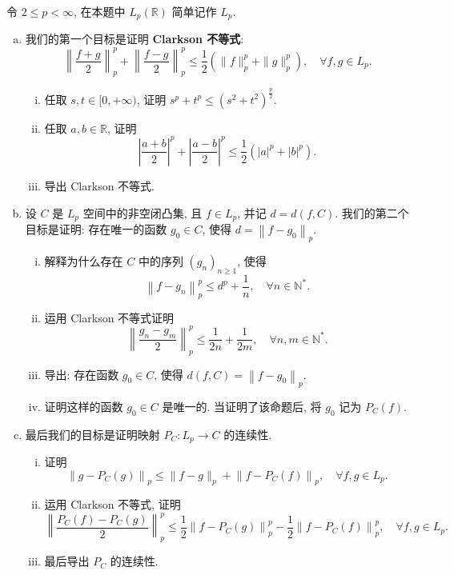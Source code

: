 \begin{exercise}
  令 $2 \leq p<\infty$, 在本题中 $L_{p}(\mathbb{R})$ 简单记作 $L_{p}$.
  \begin{enumerate}[(a)]
    \item 我们的第一个目标是证明 \textbf{Clarkson 不等式}:
      \[ \left\|\frac{f+g}{2}\right\|_{p}^{p}+\left\|\frac{f-g}{2}\right\|_{p}^{p} \leq \frac{1}{2}\left(\|f\|_{p}^{p}+\|g\|_{p}^{p}\right), \quad \forall f, g \in L_{p}. \]
      \begin{enumerate}[(i)]
        \item 任取 $s, t \in[0,+\infty)$, 证明 $s^{p}+t^{p} \leq\left(s^{2}+t^{2}\right)^{\frac{p}{2}}$.
        \item 任取 $a, b \in \mathbb{R}$, 证明
        \[\left|\frac{a+b}{2}\right|^{p}+\left|\frac{a-b}{2}\right|^{p} \leq \frac{1}{2}\left(|a|^{p}+|b|^{p}\right).\]
        \item 导出 Clarkson 不等式.
      \end{enumerate}
    \item 设 $C$ 是 $L_{p}$ 空间中的非空闭凸集, 
      且 $f \in L_{p}$, 并记 $d=d(f, C)$. 我们的第二个目标是证明: 
      存在唯一的函数 $g_{0} \in C$, 使得 $d=\left\|f-g_{0}\right\|_{p}$.
      \begin{enumerate}[(i)]
          \item 解释为什么存在 $C$ 中的序列 $\left(g_{n}\right)_{n \geq 1}$, 使得
          \[\left\|f-g_{n}\right\|_{p}^{p} \leq d^{p}+\frac{1}{n}, \quad \forall n \in \mathbb{N}^{*}.\]
          \item 运用 Clarkson 不等式证明
          \[\left\|\frac{g_{n}-g_{m}}{2}\right\|_{p}^{p} \leq \frac{1}{2n}+\frac{1}{2m}, \quad \forall n, m \in \mathbb{N}^{*}.\]
          \item 导出: 存在函数 $g_{0} \in C$, 使得 $d(f, C)=\left\|f-g_{0}\right\|_{p}$.
          \item 证明这样的函数 $g_{0} \in C$ 是唯一的. 当证明了该命题后, 将 $g_{0}$ 记为 $P_{C}(f)$.
      \end{enumerate}
    \item 最后我们的目标是证明映射 $P_{C}: L_{p} \rightarrow C$ 的连续性.
      \begin{enumerate}[(i)]
          \item 证明
          \[\left\|g-P_{C}(g)\right\|_{p} \leq\|f-g\|_{p}+\left\|f-P_{C}(f)\right\|_{p}, \quad \forall f, g \in L_{p}.\]
          \item 运用 Clarkson 不等式, 证明
          \[\left\|\frac{P_{C}(f)-P_{C}(g)}{2}\right\|_{p}^{p} \leq \frac{1}{2}\left\|f-P_{C}(g)\right\|_{p}^{p}-\frac{1}{2}\left\|f-P_{C}(f)\right\|_{p}^{p}, \quad \forall f, g \in L_{p}.\]
          \item 最后导出 $P_{C}$ 的连续性.
      \end{enumerate}
  \end{enumerate}
\end{exercise}

